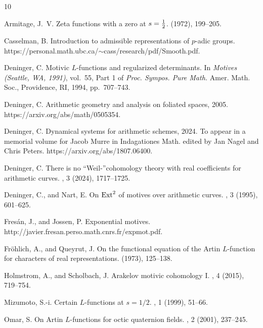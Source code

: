 \documentclass[12pt,leqno]{article}
\begin{document}
\begin{thebibliography}{10}

{\sc Armitage, J.~V.}
\newblock Zeta functions with a zero at {$s={1\over 2}$}.
 (1972), 199--205.

{\sc Casselman, B.}
\newblock Introduction to admissible representations of $p$-adic groups.
\newblock https://personal.math.ubc.ca/$\sim$cass/research/pdf/Smooth.pdf.

{\sc Deninger, C.}
\newblock Motivic {$L$}-functions and regularized determinants.
\newblock In {\em Motives ({S}eattle, {WA}, 1991)}, vol.~55, Part 1 of {\em
  Proc. Sympos. Pure Math.} Amer. Math. Soc., Providence, RI, 1994,
  pp.~707--743.

{\sc Deninger, C.}
\newblock Arithmetic geometry and analysis on foliated spaces, 2005.
\newblock https://arxiv.org/abs/math/0505354.

{\sc Deninger, C.}
\newblock Dynamical systems for arithmetic schemes, 2024.
\newblock To appear in a memorial volume for Jacob Murre in {I}ndagationes
  {M}ath. edited by {J}an {N}agel and {C}hris {P}eters.
  https://arxiv.org/abs/1807.06400.

{\sc Deninger, C.}
\newblock There is no ``{W}eil-''cohomology theory with real coefficients for
  arithmetic curves.
, 3 (2024),
  1717--1725.

{\sc Deninger, C., and Nart, E.}
\newblock On {${\rm Ext}^2$} of motives over arithmetic curves.
, 3 (1995), 601--625.

{\sc Fres\'an, J., and Jossen, P.}
\newblock Exponential motives.
\newblock http://javier.fresan.perso.math.cnrs.fr/expmot.pdf.

{\sc Fr\"ohlich, A., and Queyrut, J.}
\newblock On the functional equation of the {A}rtin {$L$}-function for
  characters of real representations.
 (1973), 125--138.

{\sc Holmstrom, A., and Scholbach, J.}
\newblock Arakelov motivic cohomology {I}.
, 4 (2015), 719--754.

{\sc Mizumoto, S.-i.}
\newblock Certain {$L$}-functions at {$s=1/2$}.
, 1 (1999), 51--66.

{\sc Omar, S.}
\newblock On {A}rtin {$L$}-functions for octic quaternion fields.
, 2 (2001), 237--245.


\end{thebibliography}
\end{document}
